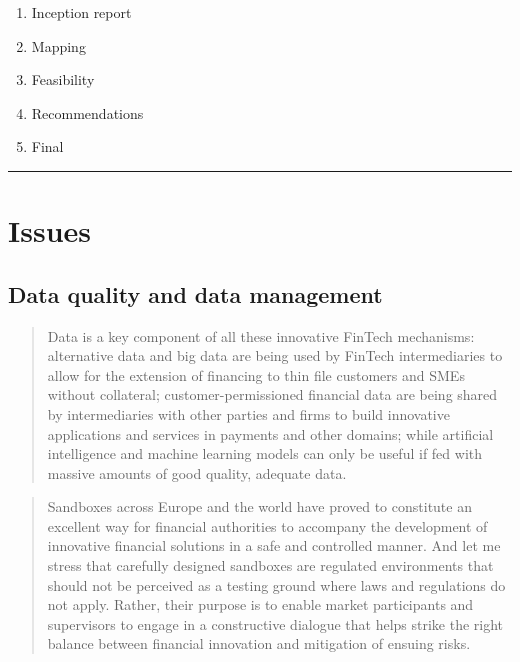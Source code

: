 \documentclass[
]{book}
\begin{document}
\begin{enumerate}
\def\labelenumi{\arabic{enumi}.}
\item
  Inception report
\item
  Mapping
\item
  Feasibility
\item
  Recommendations
\item
  Final
\end{enumerate}

\begin{center}\rule{0.5\linewidth}{0.5pt}\end{center}

\hypertarget{issues}{%
\section{Issues}\label{issues}}

\hypertarget{data-quality-and-data-management}{%
\subsection{Data quality and data management}\label{data-quality-and-data-management}}

\begin{quote}
Data is a key component of all these innovative FinTech mechanisms:
alternative data and big data are being used by FinTech intermediaries to allow
for the extension of financing to thin file customers and SMEs without
collateral; customer-permissioned financial data are being shared by
intermediaries with other parties and firms to build innovative applications and
services in payments and other domains; while artificial intelligence and
machine learning models can only be useful if fed with massive amounts of
good quality, adequate data.
\end{quote}

\begin{quote}
Sandboxes across Europe and the world have proved to constitute an excellent
way for financial authorities to accompany the development of innovative
financial solutions in a safe and controlled manner. And let me stress that
carefully designed sandboxes are regulated environments that should not be
perceived as a testing ground where laws and regulations do not apply. Rather,
their purpose is to enable market participants and supervisors to engage in a
constructive dialogue that helps strike the right balance between financial
innovation and mitigation of ensuing risks.
\end{quote}
\end{document}
